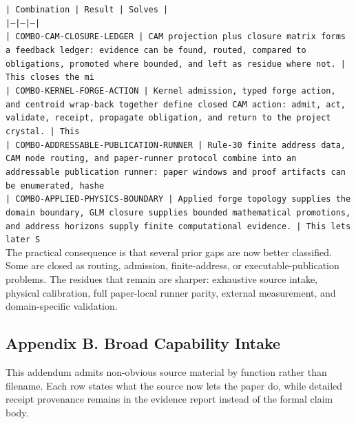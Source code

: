 \documentclass[11pt]{article}
\begin{document}
\noindent\texttt{| Combination | Result | Solves |}\\
\noindent\texttt{|---|---|---|}\\
\noindent\texttt{| COMBO-CAM-CLOSURE-LEDGER | CAM projection plus closure matrix forms a feedback ledger: evidence can be found, routed, compared to obligations, promoted where bounded, and left as residue where not. | This closes the mi}\\
\noindent\texttt{| COMBO-KERNEL-FORGE-ACTION | Kernel admission, typed forge action, and centroid wrap-back together define closed CAM action: admit, act, validate, receipt, propagate obligation, and return to the project crystal. | This}\\
\noindent\texttt{| COMBO-ADDRESSABLE-PUBLICATION-RUNNER | Rule-30 finite address data, CAM node routing, and paper-runner protocol combine into an addressable publication runner: paper windows and proof artifacts can be enumerated, hashe}\\
\noindent\texttt{| COMBO-APPLIED-PHYSICS-BOUNDARY | Applied forge topology supplies the domain boundary, GLM closure supplies bounded mathematical promotions, and address horizons supply finite computational evidence. | This lets later S}\\

The practical consequence is that several prior gaps are now better classified. Some are closed as routing, admission, finite-address, or executable-publication problems. The residues that remain are sharper: exhaustive source intake, physical calibration, full paper-local runner parity, external measurement, and domain-specific validation.

\subsection*{Appendix B. Broad Capability Intake}

This addendum admits non-obvious source material by function rather than filename. Each row states what the source now lets the paper do, while detailed receipt provenance remains in the evidence report instead of the formal claim body.
\end{document}
